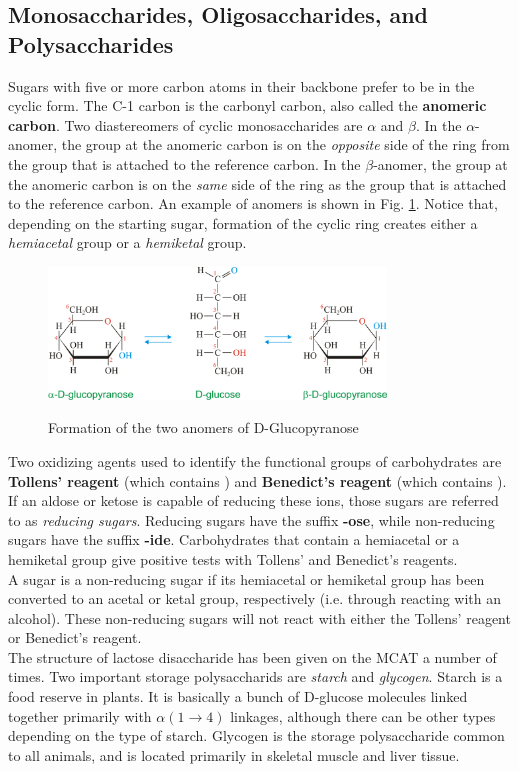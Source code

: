 \documentclass{article}
\theoremstyle{plain}%
\theoremstyle{definition}
\theoremstyle{remark}
\begin{document}
\subsection{Monosaccharides, Oligosaccharides, and Polysaccharides}
Sugars with five or more carbon atoms in their backbone prefer to be in the cyclic form. The C-1 carbon is the carbonyl carbon, also called the \textbf{anomeric carbon}. Two diastereomers of cyclic monosaccharides are $\alpha$ and $\beta$. In the $\alpha$-anomer, the  group at the anomeric carbon is on the \textit{opposite} side of the ring from the  group that is attached to the reference carbon. In the $\beta$-anomer, the  group at the anomeric carbon is on the \textit{same} side of the ring as the  group that is attached to the reference carbon. An example of anomers is shown in Fig. \ref{anomers}. Notice that, depending on the starting sugar, formation of the cyclic ring creates either a \textit{hemiacetal} group or a \textit{hemiketal} group. 
\begin{figure}[h!]
\centering
\includegraphics[width=0.8\textwidth]{anomers.png} \label{anomers}
\caption{Formation of the two anomers of D-Glucopyranose}
\end{figure}
\indent Two oxidizing agents used to identify the functional groups of carbohydrates are \textbf{Tollens' reagent} (which contains ) and \textbf{Benedict's reagent} (which contains ). If an aldose or ketose is capable of reducing these ions, those sugars are referred to as \textit{reducing sugars}. Reducing sugars have the suffix \textbf{-ose}, while non-reducing sugars have the suffix \textbf{-ide}. Carbohydrates that contain a hemiacetal or a hemiketal group give positive tests with Tollens' and Benedict's reagents.\\
\indent A sugar is a non-reducing sugar if its hemiacetal or hemiketal group has been converted to an acetal or ketal group, respectively (i.e. through reacting with an alcohol). These non-reducing sugars will not react with either the Tollens' reagent or Benedict's reagent. \\
\indent The structure of lactose disaccharide has been given on the MCAT a number of times. Two important storage polysaccharids are \textit{starch} and \textit{glycogen}. Starch is a food reserve in plants. It is basically a bunch of D-glucose molecules linked together primarily with $\alpha\left(1\rightarrow 4\right)$ linkages, although there can be other types depending on the type of starch. Glycogen is the storage polysaccharide common to all animals, and is located primarily in skeletal muscle and liver tissue.
\end{document}
